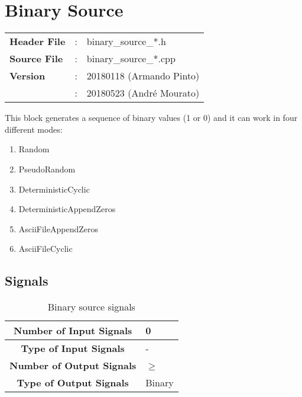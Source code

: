 \clearpage
\graphicspath{{./lib/binary_source/figures/}}
\section{Binary Source}

\begin{tcolorbox}	
	\begin{tabular}{p{2.75cm} p{0.2cm} p{10.5cm}} 	
		\textbf{Header File}   &:& binary\_source\_*.h \\
		\textbf{Source File}   &:& binary\_source\_*.cpp \\
        \textbf{Version}       &:& 20180118 (Armando Pinto)\\
                               &:& 20180523 (Andr\'e Mourato)
	\end{tabular}
\end{tcolorbox}

\maketitle
This block generates a sequence of binary values (1 or 0) and it can work in four different modes:

\begin{multicols}{3}
\begin{enumerate}
	\item Random
	\item PseudoRandom
	\item DeterministicCyclic
	\item DeterministicAppendZeros
    \item AsciiFileAppendZeros
    \item AsciiFileCyclic
\end{enumerate}
\end{multicols}

\subsection*{Signals}

\begin{table}[h]
	\begin{tabular}{|c|l|}
		\hline
		\textbf{Number of Input Signals} & 0 \\ \hline
        \textbf{Type of Input Signals} & - \\ \hline
    	\textbf{Number of Output Signals} & $\geq $ \ \\ \hline
        \textbf{Type of Output Signals} & Binary \\ \hline
	\end{tabular}
	\caption{Binary source signals}
	\label{table:bin_sour_signals}
\end{table}

